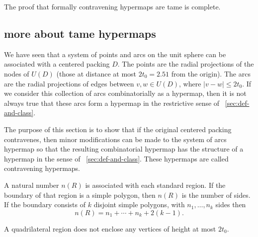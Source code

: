 The proof that formally contravening hypermaps are tame is complete.

\subsection{more about tame hypermaps}

We have seen that a system of points and arcs on the unit sphere
can be associated with a centered packing $D$.  The points are the
radial projections of the nodes of $U(D)$ (those at distance at
most $2t_0=2.51$ from the origin).  The arcs are the radial
projections of edges between $v,w\in U(D)$, where $|v-w|\le2t_0$.
If we consider this collection of arcs combinatorially as a
hypermap, then it is not always true that these arcs form a
hypermap in the restrictive sense of
\Chap~\ref{sec:def-and-class}.

The purpose of this section is to show that if the original
centered packing contravenes, then minor modifications can be made
to the system of arcs hypermap so that the resulting combinatorial
hypermap has the structure of a hypermap in the sense of
\Chap~\ref{sec:def-and-class}. These hypermaps are called
contravening hypermaps.

A natural number $n(R)$ is associated with each standard region. If
the boundary of that region is a simple polygon, then $n(R)$ is the
number of sides.   If the boundary consists of $k$ disjoint simple
polygons, with $n_1,\ldots,n_k$ sides then
    $$n(R) = n_1+\cdots+n_k + 2(k-1).$$


\begin{lemma}\label{lemma:enclosed:bis} %
A quadrilateral region does not enclose any vertices of height at
most $2t_0$.
\end{lemma}







